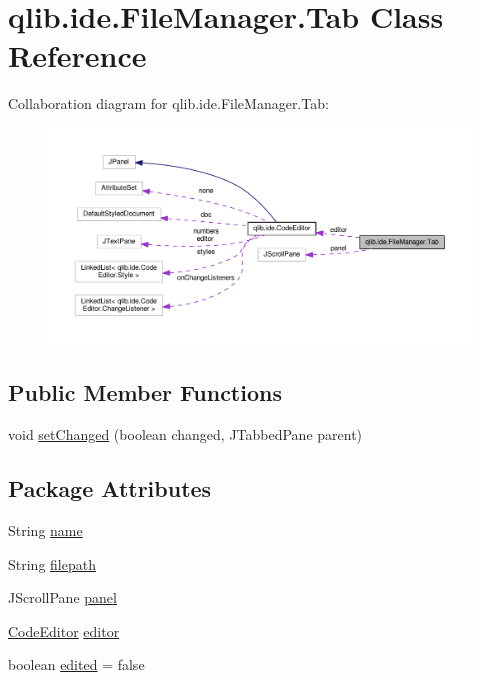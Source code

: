 \hypertarget{classqlib_1_1ide_1_1FileManager_1_1Tab}{}\section{qlib.\+ide.\+File\+Manager.\+Tab Class Reference}
\label{classqlib_1_1ide_1_1FileManager_1_1Tab}


Collaboration diagram for qlib.\+ide.\+File\+Manager.\+Tab\+:\nopagebreak
\begin{figure}[H]
\begin{center}
\leavevmode
\includegraphics[width=350pt]{classqlib_1_1ide_1_1FileManager_1_1Tab__coll__graph}
\end{center}
\end{figure}
\subsection*{Public Member Functions}
\begin{DoxyCompactItemize}
\item 
void \hyperlink{classqlib_1_1ide_1_1FileManager_1_1Tab_a88f607b1e5cf352c82788451188e8bc8}{set\+Changed} (boolean changed, J\+Tabbed\+Pane parent)
\end{DoxyCompactItemize}
\subsection*{Package Attributes}
\begin{DoxyCompactItemize}
\item 
String \hyperlink{classqlib_1_1ide_1_1FileManager_1_1Tab_ad12255d140c8ad871496cfa64157c987}{name}
\item 
String \hyperlink{classqlib_1_1ide_1_1FileManager_1_1Tab_a0765cadcc1dc2dcecdc902bb72c0f573}{filepath}
\item 
J\+Scroll\+Pane \hyperlink{classqlib_1_1ide_1_1FileManager_1_1Tab_ad8b41415e7daa1153c2f0a16278362a4}{panel}
\item 
\hyperlink{classqlib_1_1ide_1_1CodeEditor}{Code\+Editor} \hyperlink{classqlib_1_1ide_1_1FileManager_1_1Tab_a31feec1d770cf8dad4b3544539664da9}{editor}
\item 
boolean \hyperlink{classqlib_1_1ide_1_1FileManager_1_1Tab_a7d3928b4e9fbc952f9b0ff263bfa48fe}{edited} = false
\end{DoxyCompactItemize}


